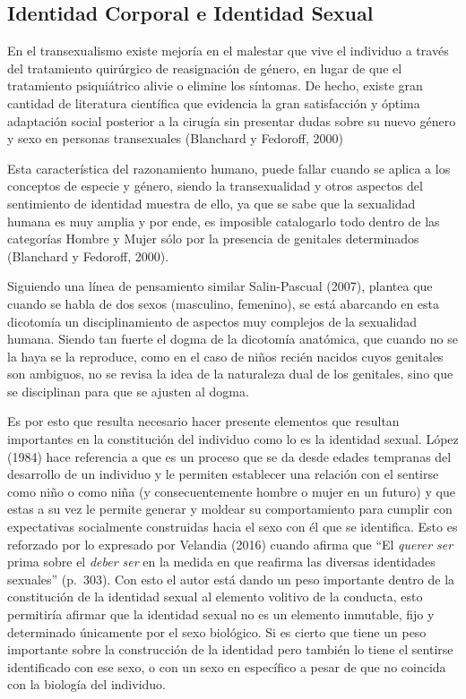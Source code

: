 \subsection{Identidad Corporal e Identidad Sexual}
En el transexualismo existe mejoría en el malestar que vive el individuo a
través del tratamiento quirúrgico de reasignación de género, en lugar de que el
tratamiento psiquiátrico alivie o elimine los síntomas.
De hecho, existe gran cantidad de literatura científica que evidencia la gran
satisfacción y óptima adaptación social posterior a la cirugía sin presentar
dudas sobre su nuevo género y sexo en personas transexuales (Blanchard y
Fedoroff, 2000)

Esta característica del razonamiento humano, puede fallar cuando se aplica a los
conceptos de especie y género, siendo la transexualidad y otros aspectos del
sentimiento de identidad muestra de ello, ya que se sabe que la sexualidad
humana es muy amplia y por ende, es imposible catalogarlo todo dentro de las
categorías Hombre y Mujer sólo por la presencia de genitales determinados
(Blanchard y Fedoroff, 2000).

Siguiendo una línea de pensamiento similar Salin-Pascual (2007), plantea que
cuando se habla de dos sexos (masculino, femenino), se está abarcando en esta
dicotomía un disciplinamiento de aspectos muy complejos de la sexualidad humana.
Siendo tan fuerte el dogma de la dicotomía anatómica, que cuando no se la haya
se la reproduce, como en el caso de niños recién nacidos cuyos genitales son
ambiguos, no se revisa la idea de la naturaleza dual de los genitales, sino que
se disciplinan para que se ajusten al dogma.

Es por esto que resulta necesario hacer presente elementos que resultan
importantes en la constitución del individuo como lo es la identidad sexual.
López (1984) hace referencia a que es un proceso que se da desde edades
tempranas del desarrollo de un individuo y le permiten establecer una relación
con el sentirse como niño o como niña (y consecuentemente hombre o mujer
en un futuro) y que estas a su vez le permite generar y moldear su
comportamiento para cumplir con expectativas socialmente construidas hacia el
sexo con él que se identifica.
Esto es reforzado por lo expresado por Velandia (2016) cuando afirma que “El
\emph{querer ser} prima sobre el \emph{deber ser} en la medida en que
reafirma las diversas identidades sexuales” (p.~303).
Con esto el autor está dando un peso importante dentro de la constitución de la
identidad sexual al elemento volitivo de la conducta, esto permitiría afirmar
que la identidad sexual no es un elemento inmutable, fijo y determinado
únicamente por el sexo biológico.
Si es cierto que tiene un peso importante sobre la construcción de la identidad
pero también lo tiene el sentirse identificado con ese sexo, o con un sexo en
específico a pesar de que no coincida con la biología del individuo.

